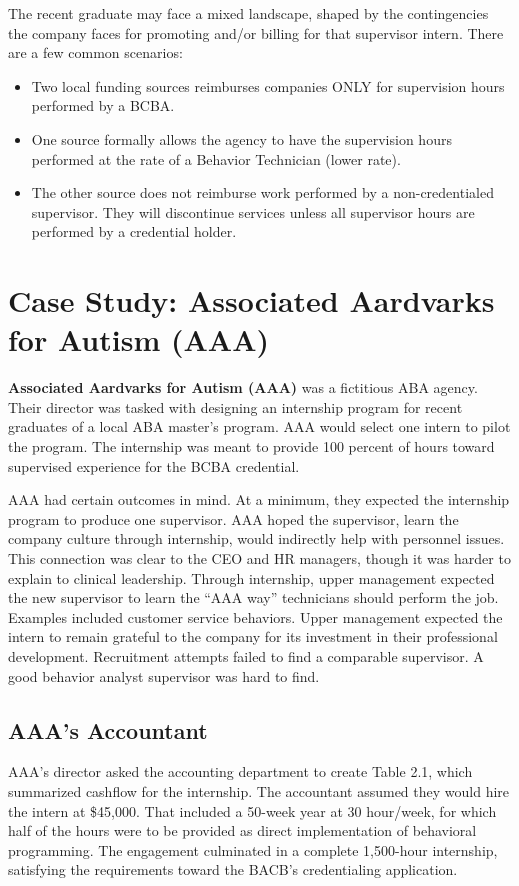 The recent graduate may face a mixed landscape, shaped by the contingencies the company faces for promoting and/or billing for that supervisor intern. There are a few common scenarios:
\begin{itemize}
\item Two local funding sources reimburses companies ONLY for supervision hours performed by a BCBA.
\item One source formally allows the agency to have the supervision hours performed at the rate of a Behavior Technician (lower rate).
\item The other source does not reimburse work performed by a non-credentialed supervisor. They will discontinue services unless all supervisor hours are performed by a credential holder.
\end{itemize}

\section{Case Study: Associated Aardvarks for Autism (AAA)}

\textbf{Associated Aardvarks for Autism (AAA)} was a fictitious ABA agency. Their director was tasked with designing an internship program for recent graduates of a local ABA master's program. AAA would select one intern to pilot the program. The internship was meant to provide 100 percent of hours toward supervised experience for the BCBA\textregistered{} credential. 

AAA had certain outcomes in mind. At a minimum, they expected the internship program to produce one supervisor. AAA hoped the supervisor, learn the company culture through internship, would indirectly help with personnel issues. This connection was clear to the CEO and HR managers, though it was harder to explain to clinical leadership. Through internship, upper management expected the new supervisor to learn the ``AAA way'' technicians should perform the job. Examples included customer service behaviors. Upper management expected the intern to remain grateful to the company for its investment in their professional development. Recruitment attempts failed to find a comparable supervisor. A good behavior analyst supervisor was hard to find. 

\subsection{AAA's Accountant}
AAA's director asked the accounting department to create Table 2.1, which summarized cashflow for the internship. The accountant assumed they would hire the intern at \$45,000. That included a 50-week year at 30 hour/week, for which half of the hours were to be provided as direct implementation of behavioral programming. The engagement culminated in a complete 1,500-hour internship, satisfying the requirements toward the BACB\textregistered{}'s credentialing application. 

